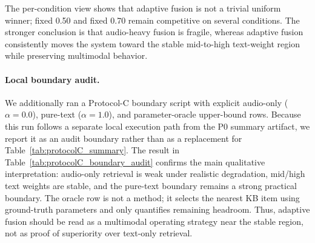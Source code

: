 \documentclass{article}
\begin{document}
The per-condition view shows that adaptive fusion is not a trivial uniform winner; fixed 0.50 and fixed 0.70 remain competitive on several conditions. The stronger conclusion is that audio-heavy fusion is fragile, whereas adaptive fusion consistently moves the system toward the stable mid-to-high text-weight region while preserving multimodal behavior.

\paragraph{Local boundary audit.}
We additionally ran a Protocol-C boundary script with explicit audio-only ($\alpha=0.0$), pure-text ($\alpha=1.0$), and parameter-oracle upper-bound rows. Because this run follows a separate local execution path from the P0 summary artifact, we report it as an audit boundary rather than as a replacement for Table~\ref{tab:protocolC_summary}. The result in Table~\ref{tab:protocolC_boundary_audit} confirms the main qualitative interpretation: audio-only retrieval is weak under realistic degradation, mid/high text weights are stable, and the pure-text boundary remains a strong practical boundary. The oracle row is not a method; it selects the nearest KB item using ground-truth parameters and only quantifies remaining headroom. Thus, adaptive fusion should be read as a multimodal operating strategy near the stable region, not as proof of superiority over text-only retrieval.

\begin{table}[htbp]
	\centering
	\caption{Current-code Protocol-C boundary audit with audio-only and pure-text rows. This table is an execution-path audit artifact, not a replacement for the canonical P0 server summary.}
	\label{tab:protocolC_boundary_audit}
	\small
\end{table}
\end{document}
